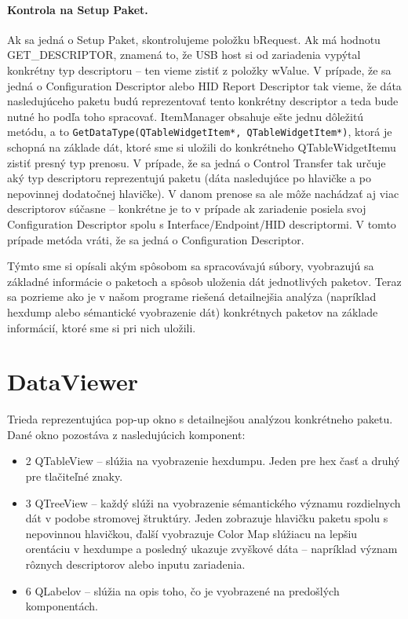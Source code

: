 \paragraph{Kontrola na Setup Paket.}
\hfill \break
Ak sa jedná o Setup Paket, skontrolujeme položku bRequest. Ak má hodnotu GET\_DESCRIPTOR, znamená to, že USB host si od zariadenia vypýtal konkrétny typ descriptoru -- ten vieme zistiť z položky wValue. V prípade, že sa jedná o Configuration Descriptor alebo HID Report Descriptor tak vieme, že dáta nasledujúceho paketu budú reprezentovať tento konkrétny descriptor a teda bude nutné ho podľa toho spracovať.
\hfill \break \newline
ItemManager obsahuje ešte jednu dôležitú metódu, a to \texttt{GetDataType(QTable\-WidgetItem*, QTableWidgetItem*)}, ktorá je schopná na základe dát, ktoré sme si uložili do konkrétneho QTableWidgetItemu zistiť presný typ prenosu. V prípade, že sa jedná o Control Transfer tak určuje aký typ descriptoru reprezentujú  paketu (dáta nasledujúce po hlavičke a po nepovinnej dodatočnej hlavičke). V danom prenose sa ale môže nachádzať aj viac descriptorov súčasne -- konkrétne je to v prípade ak zariadenie posiela svoj Configuration Descriptor spolu s Interface/Endpoint/HID descriptormi. V tomto prípade metóda vráti, že sa jedná o Configuration Descriptor.

Týmto sme si opísali akým spôsobom sa spracovávajú súbory, vyobrazujú sa základné informácie o paketoch a spôsob uloženia dát jednotlivých paketov. Teraz sa pozrieme ako je v našom programe riešená detailnejšia analýza (napríklad hexdump alebo sémantické vyobrazenie dát) konkrétnych paketov na základe informácií, ktoré sme si pri nich uložili.

\section{DataViewer}
Trieda reprezentujúca pop-up okno s detailnejšou analýzou konkrétneho paketu. Dané okno pozostáva z nasledujúcich komponent:
\begin{itemize}
\item 2 QTableView -- slúžia na vyobrazenie hexdumpu. Jeden pre hex časť a druhý pre tlačiteľné znaky.
\item 3 QTreeView -- každý slúži na vyobrazenie sémantického významu rozdielnych dát v podobe stromovej štruktúry. Jeden zobrazuje hlavičku paketu spolu s nepovinnou hlavičkou, ďalší vyobrazuje Color Map slúžiacu na lepšiu orentáciu v hexdumpe a posledný ukazuje zvyškové dáta -- napríklad význam rôznych descriptorov alebo inputu zariadenia.
\item 6 QLabelov -- slúžia na opis toho, čo je vyobrazené na predošlých komponentách. 
\end{itemize}

